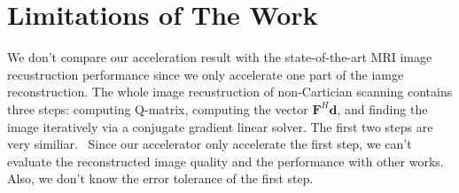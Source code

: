 \section{Limitations of The Work}

We don't compare our acceleration result with the state-of-the-art MRI image
recustruction performance since we only accelerate one part of the iamge
reconstruction. The whole image recustruction of non-Cartician scanning contains
three steps: computing Q-matrix, computing the vector $\mathbf{F}^{H}
\mathbf{d}$, and finding the image iteratively via a conjugate gradient linear
solver. The first two steps are very similiar.~\cite{stone2008accelerating}
Since our accelerator only accelerate the first step, we can't evaluate the
reconstructed image quality and the performance with other works. Also, we don't
know the error tolerance of the first step.
